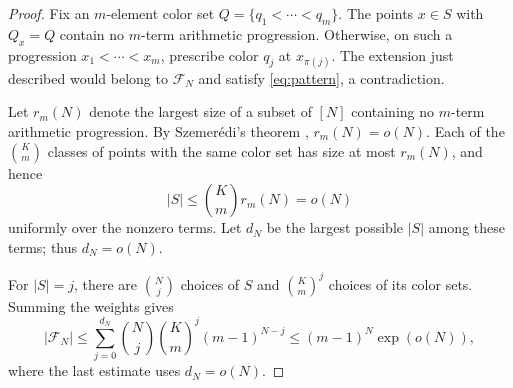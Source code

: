 \documentclass[11pt]{article}
\theoremstyle{remark}
\numberwithin{equation}{section}
\newcommand{\calF}{\mathcal F}
\begin{document}
\begin{proof}
Fix an $m$-element color set $Q=\{q_1<\cdots<q_m\}$. The points $x\in S$ with $Q_x=Q$ contain no $m$-term arithmetic progression. Otherwise, on such a progression $x_1<\cdots<x_m$, prescribe color $q_j$ at $x_{\pi(j)}$. The extension just described would belong to $\calF_N$ and satisfy \eqref{eq:pattern}, a contradiction.

Let $r_m(N)$ denote the largest size of a subset of $[N]$ containing no $m$-term arithmetic progression. By Szemer\'edi's theorem \cite{Szemeredi}, $r_m(N)=o(N)$. Each of the $\binom Km$ classes of points with the same color set has size at most $r_m(N)$, and hence
\[
 |S|\leq\binom Km r_m(N)=o(N)
\]
uniformly over the nonzero terms. Let $d_N$ be the largest possible $|S|$ among these terms; thus $d_N=o(N)$.

For $|S|=j$, there are $\binom Nj$ choices of $S$ and $\binom{K}{m}^{j}$ choices of its color sets. Summing the weights gives
\[
 |\calF_N|\leq\sum_{j=0}^{d_N}\binom Nj\binom{K}{m}^{j}(m-1)^{N-j}
 \leq(m-1)^N\exp(o(N)),
\]
where the last estimate uses $d_N=o(N)$.
\end{proof}
\end{document}
